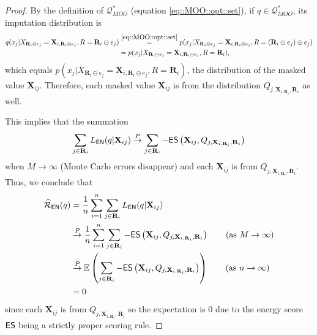 \documentclass[aos, preprint]{imsart}
\theoremstyle{plain}
\theoremstyle{definition}
\let\hat\widehat
\newcommand{\E}{\mbox{$\mathbb{E}$}}
\newcommand{\bX}{\mathbf{X}}
\newcommand{\bR}{\mathbf{R}}
\begin{document}
\begin{appendix}
\begin{proof}

By the definition of $\mathcal{Q}^*_{MOO}$ (equation \eqref{eq::MOO::opt::set}), if $q \in \mathcal{Q}^*_{MOO}$, its imputation distribution is 
\begin{align*}
q(x_j|X_{\bR_i\ominus e_j} = \bX_{i, \bR_i\ominus e_j}, R = \bR_i\ominus e_j) &\overset{\eqref{eq::MOO::opt::set}}{=} p(x_j|X_{\bR_i\ominus e_j} = \bX_{i, \bR_i\ominus e_j}, R = (\bR_i\ominus e_j)\oplus e_j)\\
& = p(x_j|X_{\bR_i\ominus e_j} = \bX_{i, \bR_i\ominus e_j}, R = \bR_i),
\end{align*}
which equals $p(x_j|X_{\bR_i\ominus e_j} = \bX_{i, \bR_i\ominus e_j}, R = \bR_i)$, 
the distribution of the masked value $\bX_{ij}$.
Therefore, each masked value $\bX_{ij}$ is  from the distribution $Q_{j, \bX_{i, \bR_i}, \bR_i}$
as well. 

This implies that the summation 
$$
\sum_{j\in \bR_i} L_{\sf EN}(q|\bX_{ij})\overset{P}{\rightarrow} \sum_{j\in \bR_i} -{\sf ES} \left(\bX_{ij}, Q_{j, \bX_{i, \bR_i}, \bR_i}\right)
$$
when $M\rightarrow\infty$ (Monte Carlo errors disappear)
and each $\bX_{ij}$ is from $Q_{j, \bX_{i, \bR_i}, \bR_i}$. 
Thus, 
we conclude that 
\begin{align*}
\hat{\mathcal{R}}_{\sf EN}(q) &= \frac{1}{n}\sum_{i=1}^n \sum_{j\in \bR_i} L_{\sf EN}(q|\bX_{ij})\\
& \overset{P}{\rightarrow}  \frac{1}{n}\sum_{i=1}^n\sum_{j\in \bR_i} -{\sf ES} \left(\bX_{ij}, Q_{j, \bX_{i, \bR_i}, \bR_i}\right)\qquad \mbox{(as $M\rightarrow\infty$)}\\
& \overset{P}{\rightarrow}  \E\left(\sum_{j\in \bR_i} -{\sf ES} \left(\bX_{ij}, Q_{j, \bX_{i, \bR_i}, \bR_i}\right)\right)\qquad \mbox{(as $n\rightarrow\infty$)}\\
& = 0
\end{align*}
since each $\bX_{ij}$  is from $Q_{j, \bX_{i, \bR_i}, \bR_i}$
so the expectation is $0$ due to the energy score ${\sf ES}$ being a strictly proper scoring rule. 




\end{proof}
\end{appendix}
\end{document}
